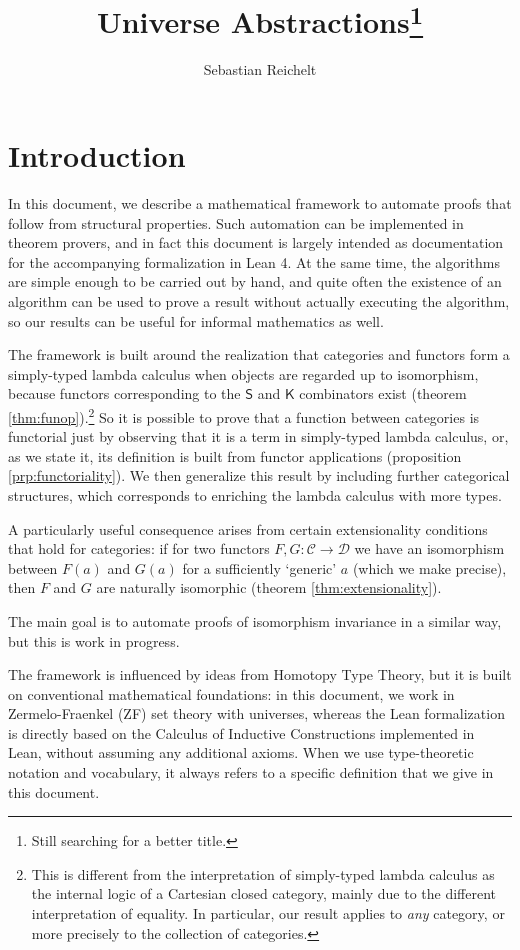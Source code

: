\documentclass[a4paper]{article}
\title{Universe Abstractions\footnote{Still searching for a better title.}}
\author{Sebastian Reichelt}
\theoremstyle{definition}
\theoremstyle{remark}
\newcommand{\C}{\mathcal{C}}
\newcommand{\D}{\mathcal{D}}
\newcommand{\nm}{\mathsf}
\begin{document}
\maketitle

\section{Introduction}

In this document, we describe a mathematical framework to automate proofs that follow from structural
properties. Such automation can be implemented in theorem provers, and in fact this document is
largely intended as documentation for the accompanying formalization in Lean 4\cite{lean4}.
At the same time, the algorithms are simple enough to be carried out by hand, and quite often the
existence of an algorithm can be used to prove a result without actually executing the algorithm, so
our results can be useful for informal mathematics as well.

The framework is built around the realization that categories and functors form a simply-typed lambda
calculus\cite{simply-typed-lambda-calculus} when objects are regarded up to isomorphism, because
functors corresponding to the $\nm{S}$ and $\nm{K}$ combinators exist (theorem
\ref{thm:funop}).\footnote{This is different from the interpretation of simply-typed lambda calculus
as the internal logic of a Cartesian closed category, mainly due to the different interpretation of
equality. In particular, our result applies to \emph{any} category, or more precisely to the
collection of categories.}
So it is possible to prove that a function between categories is functorial just by observing that it
is a term in simply-typed lambda calculus, or, as we state it, its definition is built from functor
applications (proposition \ref{prp:functoriality}). We then generalize this result by including
further categorical structures, which corresponds to enriching the lambda calculus with more types.

A particularly useful consequence arises from certain extensionality conditions that hold for
categories: if for two functors $F,G : \C \to \D$ we have an isomorphism between $F(a)$ and $G(a)$
for a sufficiently `generic' $a$ (which we make precise), then $F$ and $G$ are naturally isomorphic
(theorem \ref{thm:extensionality}).

The main goal is to automate proofs of isomorphism invariance in a similar way, but this is work in
progress.

The framework is influenced by ideas from Homotopy Type Theory\cite{hottbook}, but it is built on
conventional mathematical foundations: in this document, we work in Zermelo-Fraenkel (ZF) set
theory with universes, whereas the Lean formalization is directly based on the Calculus of Inductive
Constructions implemented in Lean, without assuming any additional axioms. When we use
type-theoretic notation and vocabulary, it always refers to a specific definition that we give in
this document.
\end{document}
